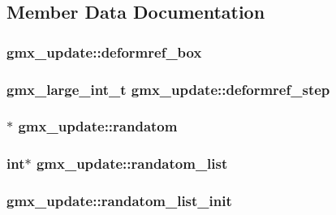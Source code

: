 \subsection{\-Member \-Data \-Documentation}
\hypertarget{structgmx__update_a3f55e60aff1c914f7c8c0d8c92f274e7}{
\subsubsection[{deformref\-\_\-box}]{ {\bf gmx\-\_\-update\-::deformref\-\_\-box}}}\label{structgmx__update_a3f55e60aff1c914f7c8c0d8c92f274e7}
\hypertarget{structgmx__update_a10fec30459ada4eef2f99368aec9aff8}{
\subsubsection[{deformref\-\_\-step}]{\setlength{\rightskip}{0pt plus 5cm}gmx\-\_\-large\-\_\-int\-\_\-t {\bf gmx\-\_\-update\-::deformref\-\_\-step}}}\label{structgmx__update_a10fec30459ada4eef2f99368aec9aff8}
\hypertarget{structgmx__update_aa0c769bb872c45822f20aa9f09259e72}{
\subsubsection[{randatom}]{$\ast$ {\bf gmx\-\_\-update\-::randatom}}}\label{structgmx__update_aa0c769bb872c45822f20aa9f09259e72}
\hypertarget{structgmx__update_ab2e7e59d117590dc3e24ed914f0f7022}{
\subsubsection[{randatom\-\_\-list}]{\setlength{\rightskip}{0pt plus 5cm}int$\ast$ {\bf gmx\-\_\-update\-::randatom\-\_\-list}}}\label{structgmx__update_ab2e7e59d117590dc3e24ed914f0f7022}
\hypertarget{structgmx__update_a6a4ba367ca083bba3982d8b8b5e6aa75}{
\subsubsection[{randatom\-\_\-list\-\_\-init}]{ {\bf gmx\-\_\-update\-::randatom\-\_\-list\-\_\-init}}}\label{structgmx__update_a6a4ba367ca083bba3982d8b8b5e6aa75}
